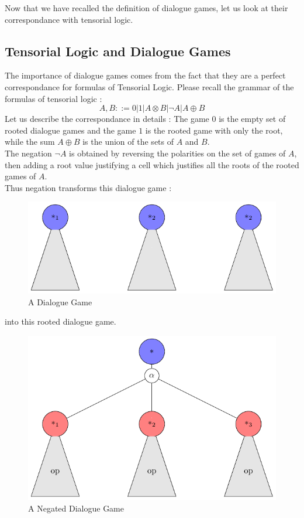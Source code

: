 \documentclass[a4paper,UKenglish]{lipics}
\begin{document}
Now that we have recalled the definition of dialogue games, let us look at their correspondance with tensorial logic.

\subsection{Tensorial Logic and Dialogue Games}
The importance of dialogue games comes from the fact that they are a perfect correspondance for formulas of Tensorial Logic. Please recall the grammar of the formulas of tensorial logic : 
$$A,B ::= 0|1 | A \otimes B | \neg A| A\oplus B$$
Let us describe the correspondance in details : The game $0$ is the empty set of rooted dialogue games and the game $1$ is the rooted game with only the root, while the sum $A \oplus B$ is the union of the sets of $A$ and $B$.\\

The negation $ \neg A$ is obtained by reversing the polarities on the set of games of $A$, then adding a root value justifying a cell which justifies all the roots of the rooted games of $A$.\\
Thus negation transforms this dialogue game :
\begin{figure}[H]\centering\includegraphics[scale=0.6]{dialoguegame2.pdf}\caption{A Dialogue Game} \end{figure}
into this rooted dialogue game.
\begin{figure}[H]\centering\includegraphics[scale=0.6]{dialoguegame3.pdf} \caption{A Negated Dialogue Game} \end{figure}
\end{document}
